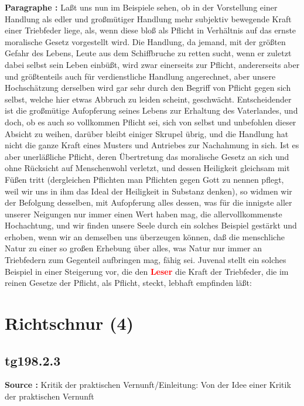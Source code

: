 \documentclass[a4paper,12pt,twoside]{book}
\newcommand{\match}[1]{\textcolor{red}{\textbf{#1}}}
\newcommand{\unnumberedsection}[1]{
	\section*{#1}
	\addcontentsline{toc}{section}{#1}
	\markright{#1}
}
\begin{document}
	\noindent\textbf{Paragraphe : }Laßt uns nun im Beispiele sehen, ob in der Vorstellung einer Handlung als edler und großmütiger Handlung mehr subjektiv bewegende Kraft einer Triebfeder liege, als, wenn diese bloß als Pflicht in Verhältnis auf das ernste moralische Gesetz vorgestellt wird. Die Handlung, da jemand, mit der größten Gefahr des Lebens, Leute aus dem Schiffbruche zu retten sucht, wenn er zuletzt dabei selbst sein Leben einbüßt, wird zwar einerseits zur Pflicht, andererseits aber und größtenteils auch für verdienstliche Handlung angerechnet, aber unsere Hochschätzung derselben wird gar sehr durch den Begriff von Pflicht gegen sich selbst, welche hier etwas Abbruch zu leiden scheint, geschwächt. Entscheidender ist die großmütige Aufopferung seines Lebens zur Erhaltung des Vaterlandes, und doch, ob es auch so vollkommen Pflicht sei, sich von selbst und unbefohlen dieser Absicht zu weihen, darüber bleibt einiger Skrupel übrig, und die Handlung hat nicht die ganze Kraft eines Musters und Antriebes zur Nachahmung in sich. Ist es aber unerläßliche Pflicht, deren Übertretung das moralische Gesetz an sich und ohne Rücksicht auf Menschenwohl verletzt, und dessen Heiligkeit gleichsam mit Füßen tritt (dergleichen Pflichten man Pflichten gegen Gott zu nennen pflegt, weil wir uns in ihm das Ideal der Heiligkeit in Substanz denken), so widmen  wir der Befolgung desselben, mit Aufopferung alles dessen, was für die innigste aller unserer Neigungen nur immer einen Wert haben mag, die allervollkommenste Hochachtung, und wir finden unsere Seele durch ein solches Beispiel gestärkt und erhoben, wenn wir an demselben uns überzeugen können, daß die menschliche Natur zu einer so großen Erhebung über alles, was Natur nur immer an Triebfedern zum Gegenteil aufbringen mag, fähig sei. Juvenal stellt ein solches Beispiel in einer Steigerung vor, die den \match{Leser} die Kraft der Triebfeder, die im reinen Gesetze der Pflicht, als Pflicht, steckt, lebhaft empfinden läßt: 
	
	\unnumberedsection{Richtschnur (4)} 
	\subsection*{tg198.2.3} 
	\textbf{Source : }Kritik der praktischen Vernunft/Einleitung: Von der Idee einer Kritik der praktischen Vernunft\\  
	
\end{document}
